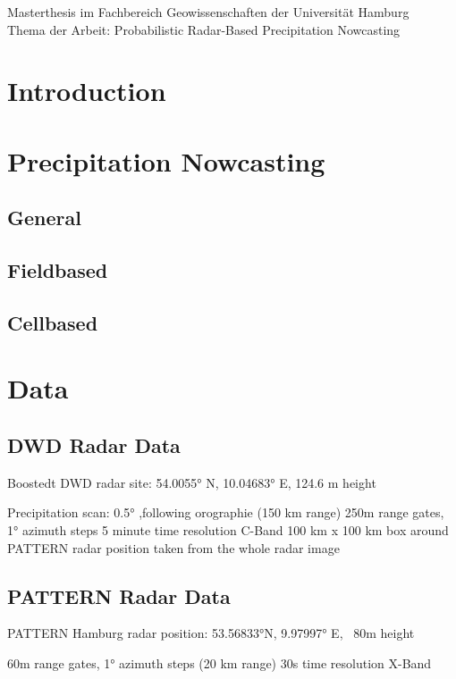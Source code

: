 \documentclass[11pt,twoside,a4paper,fleqn,x11names]{report}
\numberwithin{equation}{chapter}
\numberwithin{figure}{chapter}
\numberwithin{table}{chapter}
\begin{document}
	\newpage
	\thispagestyle{empty}
	\null
	\vfill
	Masterthesis im Fachbereich Geowissenschaften der Universität Hamburg\\
	Thema der Arbeit: \glqq Probabilistic Radar-Based Precipitation Nowcasting\grqq
	
	
\newpage
\renewcommand{\abstractname}{\huge \flushleft Abstract}
\begin{abstract}
\null
\end{abstract}
\thispagestyle{empty}
\pagestyle{empty}
\tableofcontents
\listoffigures
\listoftables
\newpage\pagestyle{fancy}
\chapter{Introduction}
\chapter{Precipitation Nowcasting}
\section{General}
\section{Fieldbased}
\section{Cellbased}
\chapter{Data}
\label{chap:data}
\section{DWD Radar Data}
Boostedt DWD radar site: 54.0055° N, 10.04683° E, 124.6 m height

Precipitation scan: 0.5° ,following orographie (150 km range)
250m range gates, 1° azimuth steps
5 minute time resolution
C-Band
100 km x 100 km box around PATTERN radar position taken from the whole radar image
\section{PATTERN Radar Data}
PATTERN Hamburg radar position: 53.56833°N, 9.97997° E, ~80m height

60m range gates, 1° azimuth steps (20 km range)
30s time resolution
X-Band
\end{document}

